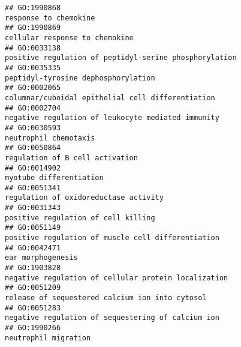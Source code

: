 \documentclass[
]{article}
\begin{document}
\begin{verbatim}
## GO:1990868                                                                                                                            response to chemokine
## GO:1990869                                                                                                                   cellular response to chemokine
## GO:0033138                                                                                           positive regulation of peptidyl-serine phosphorylation
## GO:0035335                                                                                                              peptidyl-tyrosine dephosphorylation
## GO:0002065                                                                                                columnar/cuboidal epithelial cell differentiation
## GO:0002704                                                                                               negative regulation of leukocyte mediated immunity
## GO:0030593                                                                                                                            neutrophil chemotaxis
## GO:0050864                                                                                                                  regulation of B cell activation
## GO:0014902                                                                                                                          myotube differentiation
## GO:0051341                                                                                                            regulation of oxidoreductase activity
## GO:0031343                                                                                                              positive regulation of cell killing
## GO:0051149                                                                                               positive regulation of muscle cell differentiation
## GO:0042471                                                                                                                                ear morphogenesis
## GO:1903828                                                                                             negative regulation of cellular protein localization
## GO:0051209                                                                                                  release of sequestered calcium ion into cytosol
## GO:0051283                                                                                               negative regulation of sequestering of calcium ion
## GO:1990266                                                                                                                             neutrophil migration

\end{verbatim}
\end{document}
